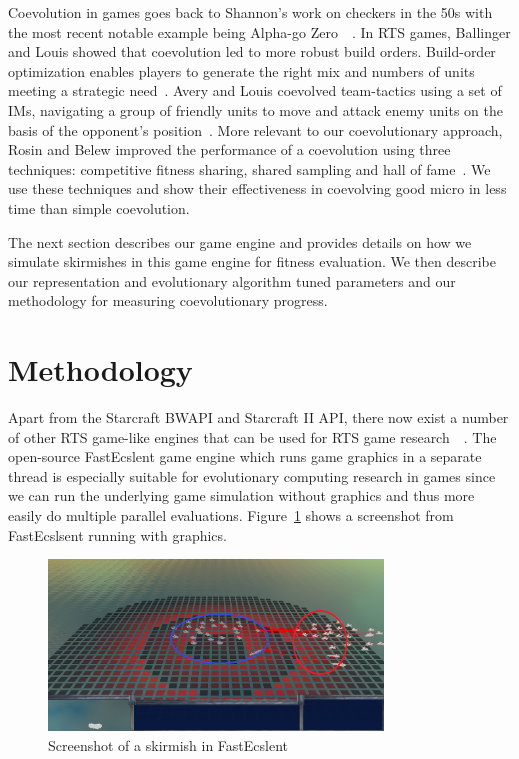 \documentclass[conference,10pt]{IEEEtran}
\begin{document}
Coevolution in games goes back to Shannon's work on checkers in the
50s with the most recent notable example being Alpha-go
Zero~\cite{GPM95}~\cite{silver2016mastering}. In RTS games,
Ballinger and Louis showed that coevolution led to more robust build
orders. Build-order optimization enables players to generate the right
mix and numbers of units meeting a strategic
need~\cite{CCGAAHFFRSGP13}. Avery and Louis coevolved team-tactics
using a set of IMs, navigating a group of friendly units to move and
attack enemy units on the basis of the opponent's
position~\cite{CIMFSTTIATG10}. More relevant to our coevolutionary
approach, Rosin and Belew improved the performance of a coevolution
using three techniques: competitive fitness sharing, shared sampling
and hall of fame~\cite{NMFCC97}. We use these techniques and show
their effectiveness in coevolving good micro in less time than simple
coevolution.

The next section describes our game engine and provides details on how
we simulate skirmishes in this game engine for fitness evaluation. We
then describe our representation and evolutionary algorithm tuned
parameters and our methodology for measuring coevolutionary progress.



\section{Methodology}
\label{SectionMethodology}

Apart from the Starcraft BWAPI and Starcraft II API, there now exist a
number of other RTS game-like engines that can be used for RTS game
research~\cite{heinermann2012bwapi}~\cite{website2014}. The open-source FastEcslent game engine
which runs game graphics in a separate thread is especially suitable
for evolutionary computing research in games since we can run the
underlying game simulation without graphics and thus more easily do
multiple parallel evaluations. Figure~\ref{Figure1} shows a screenshot
from FastEcslsent running with graphics.
\begin{figure}%
\centerline{
  \includegraphics[width=3.5in]{rtse.png}
  }
\caption{Screenshot of a skirmish in FastEcslent}
\label{Figure1}
\end{figure}
\end{document}
